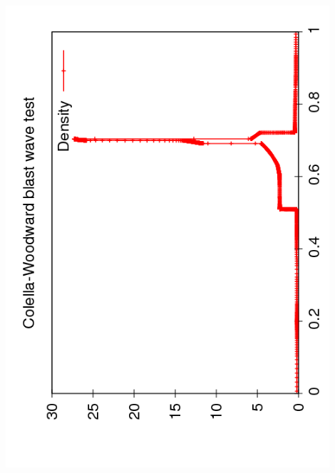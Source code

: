\documentclass{beamer}
\begin{document}
\begin{frame}
\begin{columns}
\begin{column}{0.5\textwidth}
\begin{overlayarea}{\textwidth}{0.9\textheight}
{          \includegraphics[angle=-90,width=0.9\textwidth]{figures/AMR_Density_250}\\
}
\end{overlayarea}
\end{column}
\end{columns}
\end{frame}
\end{document}
